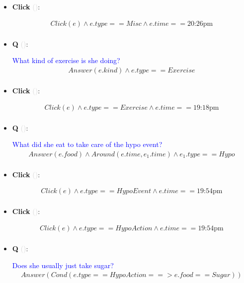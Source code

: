 \documentclass[11pt]{article}
\newcounter{CQ}
\newcounter{CClick}
\newcommand{\key}[1]{\textcolor{lightgray}{#1}}
\begin{document}
\begin{itemize}
	\item
	\textbf{Click\theCClick} \key{()}: \addtocounter{CClick}{1}
	\begin{multline*}
	Click(e) \wedge e.type == Misc \wedge e.time == \mbox{20:26pm} \\
	\end{multline*}
	
	\item
	\textbf{Q\theCQ} \key{()}: \addtocounter{CQ}{1}
	\textcolor{blue}{ What kind of exercise is she doing? }
	\begin{multline*}
	Answer(e.kind) \wedge e.type == Exercise \\
	\end{multline*}
	
	\item
	\textbf{Click\theCClick} \key{()}: \addtocounter{CClick}{1}
	\begin{multline*}
	Click(e) \wedge e.type == Exercise \wedge e.time == \mbox{19:18pm} \\
	\end{multline*}
	
	\item
	\textbf{Q\theCQ} \key{()}: \addtocounter{CQ}{1}
	\textcolor{blue}{ What did she eat to take care of the hypo event? }
	\begin{multline*}
	Answer(e.food) \wedge Around(e.time, e_1.time) \wedge e_1.type==Hypo \\
	\end{multline*}
	
	\item
	\textbf{Click\theCClick} \key{()}: \addtocounter{CClick}{1}
	\begin{multline*}
	Click(e) \wedge e.type == HypoEvent \wedge e.time == \mbox{19:54pm} \\
	\end{multline*}
	
	\item
	\textbf{Click\theCClick} \key{()}: \addtocounter{CClick}{1}
	\begin{multline*}
	Click(e) \wedge e.type == HypoAction \wedge e.time == \mbox{19:54pm} \\
	\end{multline*}
	
	\item
	\textbf{Q\theCQ} \key{()}: \addtocounter{CQ}{1}
	\textcolor{blue}{ Does she usually just take sugar? }
	\begin{multline*}
	Answer(Cond(e.type==HypoAction ==> e.food==Sugar))  \\
	\end{multline*}
	

\end{itemize}
\end{document}
